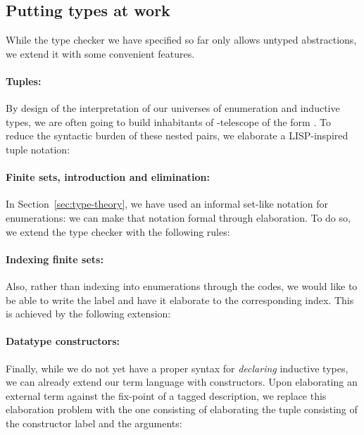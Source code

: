 \documentclass{scrartcl}
\theoremstyle{plain}
\theoremstyle{definition}
\begin{document}
\subsection{Putting types at work}


While the type checker we have specified so far only allows untyped
abstractions, we extend it with some convenient features. 



\paragraph{Tuples:}
By design of the interpretation of our universes of enumeration and
inductive types, we are often going to build inhabitants of
-telescope of the form
. To reduce the syntactic burden of
these nested pairs, we elaborate a LISP-inspired tuple notation:




\paragraph{Finite sets, introduction and elimination:}
In Section~\ref{sec:type-theory}, we have used an informal set-like
notation for enumerations: we can make that notation formal through
elaboration. To do so, we extend the type checker with the
following rules:



\paragraph{Indexing finite sets:}
Also, rather than indexing into enumerations through the 
codes, we would like to be able to write the label and have it
elaborate to the corresponding index. This is achieved by the
following extension:





\paragraph{Datatype constructors:}
Finally, while we do not yet have a proper syntax for \emph{declaring}
inductive types, we can already extend our term language with
constructors. Upon elaborating an external term  against the fix-point of a tagged description, we replace
this elaboration problem with the one consisting of elaborating the
tuple consisting of the constructor label and the arguments:
\end{document}
